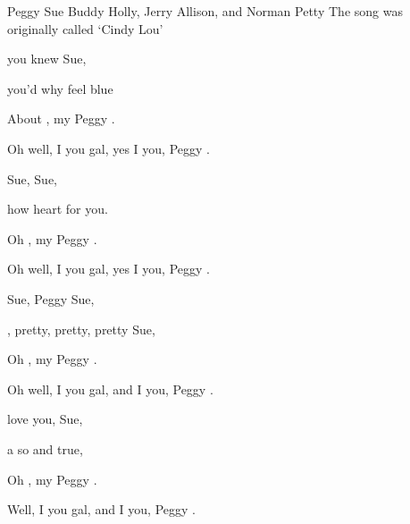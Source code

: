 \begin{SBSong}{Peggy Sue}
    {Buddy Holly, Jerry Allison, and Norman Petty}
    {The song was originally called `Cindy Lou'}
  \begin{SBVerse}
	 you knew  Sue, 

	 you'd  why  feel blue 

	About , my Peggy .  

	Oh well, I  you gal, yes I  you, Peggy .   
  \end{SBVerse}
  \begin{SBVerse}
	 Sue,  Sue, 

	 how  heart  for you. 

	Oh , my Peggy .  

	Oh well, I  you gal, yes I  you, Peggy .   
  \end{SBVerse}
  \begin{SBVerse}
	 Sue, Peggy Sue, 

	, pretty, pretty, pretty  Sue, 

	Oh , my Peggy .  

	Oh well, I  you gal, and I  you,  Peggy .   
  \end{SBVerse}
  \begin{SBVerse}
	 love you,  Sue, 

	 a  so  and true, 

	Oh , my Peggy .  

	Well, I  you gal, and I  you,  Peggy .  
  \end{SBVerse}
\end{SBSong}
